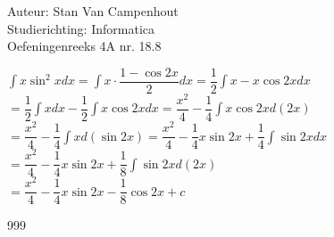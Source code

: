 \documentclass[a4paper]{article}
\begin{document}
  
\noindent \large Auteur: Stan Van Campenhout \\
\noindent \large Studierichting:  Informatica\\
\noindent \large Oefeningenreeks 4A nr. 18.8\\

\medskip

\normalsize

$ \displaystyle\int x \sin^2 x dx = \displaystyle\int x \cdot \dfrac{1 - \cos 2x}{2} dx
= \dfrac{1}{2}\displaystyle\int x - x\cos 2x dx $\\

$ = \dfrac{1}{2}\displaystyle\int x dx - \dfrac{1}{2}\displaystyle\int x\cos 2x dx 
= \dfrac{x^2}{4} - \dfrac{1}{4}\displaystyle\int x\cos 2x d\left(2x\right) $\\

$ = \dfrac{x^2}{4} - \dfrac{1}{4}\displaystyle\int x d\left(\sin 2x\right) 
= \dfrac{x^2}{4} - \dfrac{1}{4}x\sin 2x + \dfrac{1}{4}\displaystyle\int \sin2x dx $\\

$ = \dfrac{x^2}{4} - \dfrac{1}{4}x\sin 2x + \dfrac{1}{8}\displaystyle\int \sin2x d\left(2x\right) $\\

$  = \dfrac{x^2}{4} - \dfrac{1}{4}x\sin 2x - \dfrac{1}{8}\cos2x +c $\\

\begin{thebibliography}{999}
\end{thebibliography}
\end{document}

